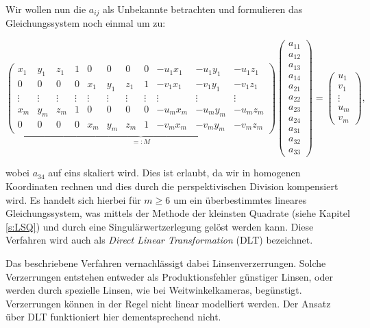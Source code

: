 Wir wollen nun die $a_{ij}$ als Unbekannte betrachten und formulieren das Gleichungssystem noch einmal um zu:
 
 \setcounter{MaxMatrixCols}{20}
\begin{equation}\label{eq:DLT}
\underbrace{\begin{pmatrix}
x_1 & y_1 & z_1 & 1 & 0 & 0 & 0 & 0 & -u_1 x_1 & -u_1 y_1 & -u_1z_1 \\
0 & 0 & 0 & 0 & x_1 & y_1 & z_1 & 1 & -v_1x_1 & -v_1y_1 & -v_1z_1 \\
\vdots & \vdots & \vdots & \vdots & \vdots & \vdots & \vdots & \vdots & \vdots & \vdots & \vdots\\
x_m & y_m & z_m & 1 & 0 & 0 & 0 & 0 & -u_m x_m & -u_m y_m & -u_m z_m \\
0 & 0 & 0 & 0 & x_m & y_m & z_m & 1 & -v_mx_m & -v_my_m & -v_mz_m
\end{pmatrix}}_{=:M}
\begin{pmatrix}
a_{11} \\ a_{12} \\ a_{13} \\ a_{14} \\ a_{21} \\ a_{22} \\ a_{23} \\ a_{24} \\ a_{31} \\ a_{32} \\ a_{33}
\end{pmatrix} = 
\begin{pmatrix}
u_1 \\ v_1 \\ \vdots \\ u_m \\ v_m
\end{pmatrix},
\end{equation}

wobei $a_{34}$ auf eins skaliert wird. Dies ist erlaubt, da wir in homogenen Koordinaten rechnen und dies durch die perspektivischen Division kompensiert wird.  Es handelt sich hierbei für $m \geq 6$ um ein überbestimmtes lineares Gleichungssystem, was mittels der Methode der kleinsten Quadrate (siehe Kapitel \ref{s:LSQ}) und durch eine Singulärwertzerlegung gelöst werden kann. 
Diese Verfahren wird auch als \textit{Direct Linear Transformation} (DLT) bezeichnet.
 
Das beschriebene Verfahren vernachlässigt dabei Linsenverzerrungen. Solche Verzerrungen entstehen entweder als Produktionsfehler günstiger Linsen, oder werden durch spezielle Linsen, wie bei Weitwinkelkameras, begünstigt.  Verzerrungen können in der Regel nicht linear modelliert werden. Der Ansatz über DLT funktioniert hier dementsprechend nicht. 

